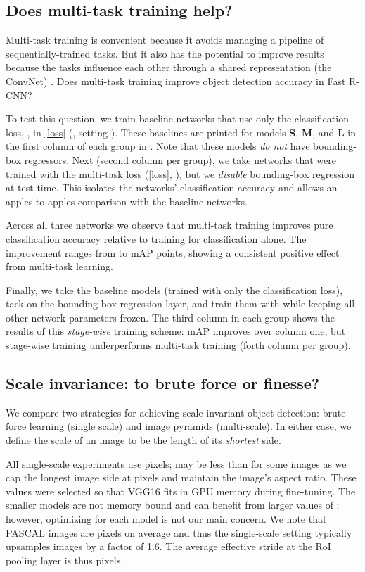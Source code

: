 \documentclass[10pt,twocolumn,letterpaper]{article}
\newcommand{\vggsixteen}{VGG16\xspace}
\newcommand{\roi}{RoI\xspace}
\newcommand{\Sm}{{\bf S}\xspace}
\newcommand{\Med}{{\bf M}\xspace}
\newcommand{\Lg}{{\bf L}\xspace}
\begin{document}
\subsection{Does multi-task training help?}
Multi-task training is convenient because it avoids managing a pipeline of sequentially-trained tasks.
But it also has the potential to improve results because the tasks influence each other through a shared representation (the ConvNet) \cite{caruana1997multitask}.
Does multi-task training improve object detection accuracy in Fast R-CNN?

To test this question, we train baseline networks that use only the classification loss, , in \eqref{loss} (\ie, setting ).
These baselines are printed for models \Sm, \Med, and \Lg in the first column of each group in .
Note that these models \emph{do not} have bounding-box regressors.
Next (second column per group), we take networks that were trained with the multi-task loss (\eqref{loss}, ), but we \emph{disable} bounding-box regression at test time.
This isolates the networks' classification accuracy and allows an apples-to-apples comparison with the baseline networks.


Across all three networks we observe that multi-task training improves pure classification accuracy relative to training for classification alone.
The improvement ranges from  to  mAP points, showing a consistent positive effect from multi-task learning.

Finally, we take the baseline models (trained with only the classification loss), tack on the bounding-box regression layer, and train them with  while keeping all other network parameters frozen.
The third column in each group shows the results of this \emph{stage-wise} training scheme: mAP improves over column one, but stage-wise training underperforms multi-task training (forth column per group).

\subsection{Scale invariance: to brute force or finesse?}
We compare two strategies for achieving scale-invariant object detection: brute-force learning (single scale) and image pyramids (multi-scale).
In either case, we define the scale  of an image to be the length of its \emph{shortest} side.

All single-scale experiments use  pixels;
 may be less than  for some images as we cap the longest image side at  pixels and maintain the image's aspect ratio.
These values were selected so that \vggsixteen fits in GPU memory during fine-tuning.
The smaller models are not memory bound and can benefit from larger values of ; however, optimizing  for each model is not our main concern.
We note that PASCAL images are  pixels on average and thus the single-scale setting typically upsamples images by a factor of 1.6.
The average effective stride at the \roi pooling layer is thus  pixels.
\end{document}
